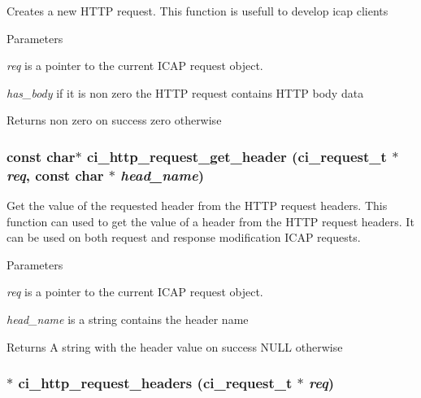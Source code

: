 Creates a new HTTP request. This function is usefull to develop icap clients 
\begin{DoxyParams}{Parameters}
\item[{\em req}]is a pointer to the current ICAP request object. \item[{\em has\_\-body}]if it is non zero the HTTP request contains HTTP body data \end{DoxyParams}
\begin{DoxyReturn}{Returns}
non zero on success zero otherwise 
\end{DoxyReturn}
\hypertarget{group__HTTP_gaff9411231824ac06df9edfe1e36e5ba2}{
\subsubsection[{ci\_\-http\_\-request\_\-get\_\-header}]{\setlength{\rightskip}{0pt plus 5cm}const char$\ast$ ci\_\-http\_\-request\_\-get\_\-header ({\bf ci\_\-request\_\-t} $\ast$ {\em req}, \/  const char $\ast$ {\em head\_\-name})}}
\label{group__HTTP_gaff9411231824ac06df9edfe1e36e5ba2}


Get the value of the requested header from the HTTP request headers. This function can used to get the value of a header from the HTTP request headers. It can be used on both request and response modification ICAP requests. 
\begin{DoxyParams}{Parameters}
\item[{\em req}]is a pointer to the current ICAP request object. \item[{\em head\_\-name}]is a string contains the header name \end{DoxyParams}
\begin{DoxyReturn}{Returns}
A string with the header value on success NULL otherwise 
\end{DoxyReturn}
\hypertarget{group__HTTP_ga540aa605e981d0b57f940bea6e37c40b}{
\subsubsection[{ci\_\-http\_\-request\_\-headers}]{$\ast$ ci\_\-http\_\-request\_\-headers ({\bf ci\_\-request\_\-t} $\ast$ {\em req})}}
\label{group__HTTP_ga540aa605e981d0b57f940bea6e37c40b}


